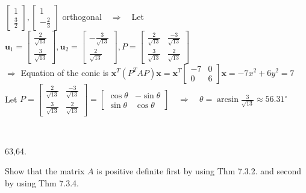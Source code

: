 \documentclass[12pt]{book}
\begin{document}
\begin{CJK}{UTF8}{bsmi}
\begin{minipage}[t]{\dimexpr\linewidth-2em}
$\begin{bmatrix}
1 \\ \frac{3}{2}
\end{bmatrix}, \begin{bmatrix}
1 \\ -\frac{2}{3}
\end{bmatrix}$ orthogonal$\quad\Rightarrow\quad$Let $\textbf{u}_1=\begin{bmatrix}
\frac{2}{\sqrt{13}} \\ \frac{3}{\sqrt{13}}
\end{bmatrix}, \textbf{u}_2=\begin{bmatrix}
-\frac{3}{\sqrt{13}} \\ \frac{2}{\sqrt{13}}
\end{bmatrix}, P=\begin{bmatrix}
\frac{2}{\sqrt{13}} & \frac{-3}{\sqrt{13}} \\ 
\frac{3}{\sqrt{13}} & \frac{2}{\sqrt{13}}
\end{bmatrix}$ \\
$\Rightarrow$ Equation of the conic is $\textbf{x}^T(P^TAP)\textbf{x}=\textbf{x}^T\begin{bmatrix}
-7 & 0 \\
0 & 6
\end{bmatrix}\textbf{x}=-7x^2+6y^2=7$ \\
Let $P=\begin{bmatrix}
\frac{2}{\sqrt{13}} & \frac{-3}{\sqrt{13}} \\ 
\frac{3}{\sqrt{13}} & \frac{2}{\sqrt{13}}
\end{bmatrix}=\begin{bmatrix}
\cos\theta & -\sin\theta \\
\sin\theta & \cos\theta
\end{bmatrix}\quad\Rightarrow\quad\theta=\arcsin\frac{3}{\sqrt{13}}\approx56.31^\circ$
\end{minipage}\\

\clearpage

63,64. \begin{minipage}[t]{\dimexpr\linewidth-2em}
Show that the matrix $A$ is positive definite first by using Thm 7.3.2. and second by using Thm 7.3.4. 
\end{minipage}


\end{CJK}
\end{document}
